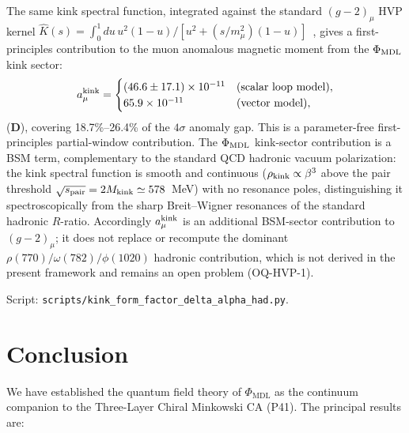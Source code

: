 \documentclass[11pt]{article}
\theoremstyle{remark}
\newcommand{\PHIMDL}{\Phi_{\mathrm{MDL}}}
\newcommand{\CatD}{\textbf{D}}
\begin{document}
The same kink spectral function, integrated against the standard
$(g-2)_\mu$ HVP kernel
$\hat{K}(s) = \int_0^1 du\,u^2(1-u)/[u^2 + (s/m_\mu^2)(1-u)]$~\cite{Aoyama2020MuonGm2},
gives a first-principles contribution to the muon anomalous magnetic
moment from the $\Phi_{\rm MDL}$ kink sector:
\begin{equation}
  a_\mu^{\rm kink} =
  \begin{cases}
    (46.6 \pm 17.1)\times 10^{-11} & \text{(scalar loop model)},\\
    65.9\times 10^{-11}            & \text{(vector model)},
  \end{cases}
  \label{eq:amu_kink}
\end{equation}
($\CatD$), covering 18.7\%--26.4\% of the $4\sigma$ anomaly gap.
This is a parameter-free first-principles partial-window contribution.
The $\Phi_{\rm MDL}$ kink-sector contribution is a BSM term,
complementary to the standard QCD hadronic vacuum polarization: the kink
spectral function is smooth and continuous ($\rho_{\rm kink} \propto
\beta^3$ above the pair threshold $\sqrt{s_{\rm pair}} =
2M_{\rm kink} \simeq 578$~MeV) with no resonance poles, distinguishing
it spectroscopically from the sharp Breit--Wigner resonances of the
standard hadronic $R$-ratio.  Accordingly $a_\mu^{\rm kink}$ is an
additional BSM-sector contribution to $(g-2)_\mu$; it does not
replace or recompute the dominant $\rho(770)/\omega(782)/\phi(1020)$
hadronic contribution, which is not derived in the present framework
and remains an open problem (OQ-HVP-1).

Script: \texttt{scripts/kink\allowbreak\_form\allowbreak\_factor\allowbreak\_delta\allowbreak\_alpha\allowbreak\_had.py}.

\section{Conclusion}
\label{sec:conclusion}

We have established the quantum field theory of $\PHIMDL$ as the continuum
companion to the Three-Layer Chiral Minkowski CA (P41).  The principal results are:
\end{document}
